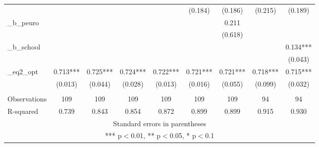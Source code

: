 \documentclass[]{article}
\begin{document}
\begin{tabular}{lcccccccc}
 &  &  &  &  & (0.184) & (0.186) & (0.215) & (0.189) \\
\_b\_peuro &  &  &  &  &  & 0.211 &  &  \\
 &  &  &  &  &  & (0.618) &  &  \\
\_b\_school &  &  &  &  &  &  &  & 0.134*** \\
 &  &  &  &  &  &  &  & (0.043) \\
\_eq2\_opt & 0.713*** & 0.725*** & 0.724*** & 0.722*** & 0.721*** & 0.721*** & 0.718*** & 0.715*** \\
 & (0.013) & (0.044) & (0.028) & (0.013) & (0.016) & (0.055) & (0.099) & (0.032) \\
 &  &  &  &  &  &  &  &  \\
Observations & 109 & 109 & 109 & 109 & 109 & 109 & 94 & 94 \\
 R-squared & 0.739 & 0.843 & 0.854 & 0.872 & 0.899 & 0.899 & 0.915 & 0.930 \\ \hline
\multicolumn{9}{c}{ Standard errors in parentheses} \\
\multicolumn{9}{c}{ *** p$<$0.01, ** p$<$0.05, * p$<$0.1} \\
\end{tabular}
\end{document}
